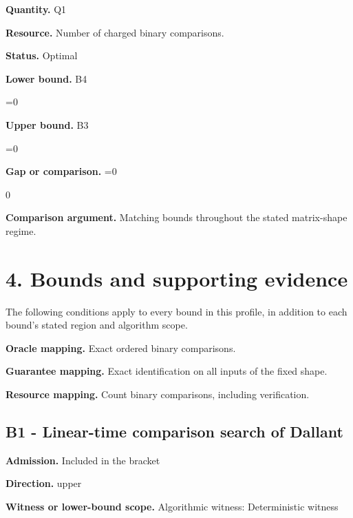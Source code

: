 \documentclass[10pt,a4paper]{article}
\newcommand{\AtlasMath}[1]{\par\begingroup\centering\setbox0=\hbox{$\displaystyle #1$}\ifdim\wd0>1.4\linewidth\typeout{ATLAS WIDE FORMULA: \the\wd0}\fi\ifdim\wd0>\linewidth\resizebox{\linewidth}{!}{\box0}\else\box0\fi\par\endgroup}
\newcommand{\AtlasInlineMath}[1]{\begingroup\setbox0=\hbox{$#1$}\ifdim\wd0>.4\linewidth\endgroup\AtlasMath{#1}\else\endgroup$#1$\fi}
\begin{document}
\textbf{Quantity.} Q1



\textbf{Resource.} Number of charged binary comparisons.



\textbf{Status.} Optimal



\textbf{Lower bound.} B4



\AtlasMath{0}


\textbf{Upper bound.} B3



\AtlasMath{0}


\textbf{Gap or comparison.} \AtlasInlineMath{0}



\textbf{Comparison argument.} Matching bounds throughout the stated matrix-shape regime.



\section{4. Bounds and supporting evidence}


The following conditions apply to every bound in this profile, in addition to each bound's stated region and algorithm scope.



\textbf{Oracle mapping.} Exact ordered binary comparisons.



\textbf{Guarantee mapping.} Exact identification on all inputs of the fixed shape.



\textbf{Resource mapping.} Count binary comparisons, including verification.



\subsection{B1 - Linear-time comparison search of Dallant}


\textbf{Admission.} Included in the bracket



\textbf{Direction.} upper



\textbf{Witness or lower-bound scope.} Algorithmic witness: Deterministic witness
\end{document}
